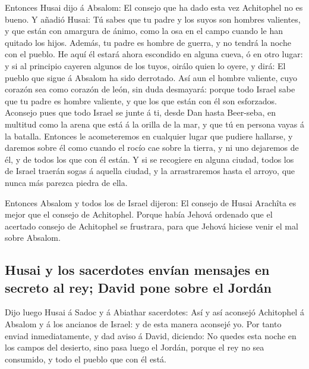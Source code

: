  Entonces Husai dijo á Absalom: El consejo que ha dado
esta vez Achitophel no es bueno.  Y añadió Husai: Tú sabes
que tu padre y los suyos son hombres valientes, y que están con amargura
de ánimo, como la osa en el campo cuando le han quitado los hijos.
Además, tu padre es hombre de guerra, y no tendrá la noche con el
pueblo.  He aquí él estará ahora escondido en alguna
cueva, ó en otro lugar: y si al principio cayeren algunos de los tuyos,
oirálo quien lo oyere, y dirá: El pueblo que sigue á Absalom ha sido
derrotado.  Así aun el hombre valiente, cuyo corazón sea
como corazón de león, sin duda desmayará: porque todo Israel sabe que tu
padre es hombre valiente, y que los que están con él son esforzados.
 Aconsejo pues que todo Israel se junte á ti, desde Dan
hasta Beer-seba, en multitud como la arena que está á la orilla de la
mar, y que tú en persona vayas á la batalla.  Entonces le
acometeremos en cualquier lugar que pudiere hallarse, y daremos sobre él
como cuando el rocío cae sobre la tierra, y ni uno dejaremos de él, y de
todos los que con él están.  Y si se recogiere en alguna
ciudad, todos los de Israel traerán sogas á aquella ciudad, y la
arrastraremos hasta el arroyo, que nunca más parezca piedra de ella.

 Entonces Absalom y todos los de Israel dijeron: El
consejo de Husai Arachîta es mejor que el consejo de Achitophel. Porque
había Jehová ordenado que el acertado consejo de Achitophel se
frustrara, para que Jehová hiciese venir el mal sobre Absalom.

\hypertarget{husai-y-los-sacerdotes-envuxedan-mensajes-en-secreto-al-rey-david-pone-sobre-el-jorduxe1n}{%
\subsection{Husai y los sacerdotes envían mensajes en secreto al rey;
David pone sobre el
Jordán}\label{husai-y-los-sacerdotes-envuxedan-mensajes-en-secreto-al-rey-david-pone-sobre-el-jorduxe1n}}

 Dijo luego Husai á Sadoc y á Abiathar sacerdotes: Así y
así aconsejó Achitophel á Absalom y á los ancianos de Israel: y de esta
manera aconsejé yo.  Por tanto enviad inmediatamente, y
dad aviso á David, diciendo: No quedes esta noche en los campos del
desierto, sino pasa luego el Jordán, porque el rey no sea consumido, y
todo el pueblo que con él está.

